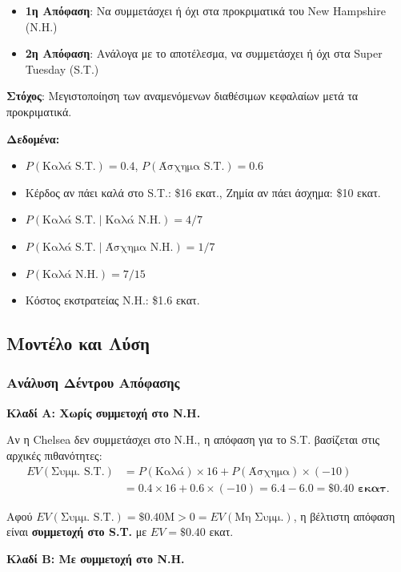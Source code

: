 \documentclass[a4paper,12pt]{article}
\begin{document}
\begin{itemize}
    \item \textbf{1η Απόφαση}: Να συμμετάσχει ή όχι στα προκριματικά του New Hampshire (N.H.)
    \item \textbf{2η Απόφαση}: Ανάλογα με το αποτέλεσμα, να συμμετάσχει ή όχι στα Super Tuesday (S.T.)
\end{itemize}

\textbf{Στόχος}: Μεγιστοποίηση των αναμενόμενων διαθέσιμων κεφαλαίων μετά τα προκριματικά.

\textbf{Δεδομένα:}
\begin{itemize}
    \item $P(\text{Καλά S.T.}) = 0.4$, \quad $P(\text{Άσχημα S.T.}) = 0.6$
    \item Κέρδος αν πάει καλά στο S.T.: \$16 εκατ., Ζημία αν πάει άσχημα: \$10 εκατ.
    \item $P(\text{Καλά S.T.} \mid \text{Καλά N.H.}) = 4/7$
    \item $P(\text{Καλά S.T.} \mid \text{Άσχημα N.H.}) = 1/7$
    \item $P(\text{Καλά N.H.}) = 7/15$
    \item Κόστος εκστρατείας N.H.: \$1.6 εκατ.
\end{itemize}

\subsection{Μοντέλο και Λύση}

\subsubsection{Ανάλυση Δέντρου Απόφασης}

\textbf{Κλαδί Α: Χωρίς συμμετοχή στο N.H.}

Αν η Chelsea δεν συμμετάσχει στο N.H., η απόφαση για το S.T. βασίζεται στις αρχικές πιθανότητες:
\begin{align}
EV(\text{Συμμ. S.T.}) &= P(\text{Καλά}) \times 16 + P(\text{Άσχημα}) \times (-10) \nonumber \\
&= 0.4 \times 16 + 0.6 \times (-10) = 6.4 - 6.0 = \mathbf{\$0.40 \text{ εκατ.}}
\end{align}

Αφού $EV(\text{Συμμ. S.T.}) = \$0.40\text{M} > 0 = EV(\text{Μη Συμμ.})$, η βέλτιστη απόφαση είναι \textbf{συμμετοχή στο S.T.} με $EV = \$0.40$ εκατ.

\textbf{Κλαδί Β: Με συμμετοχή στο N.H.}
\end{document}
